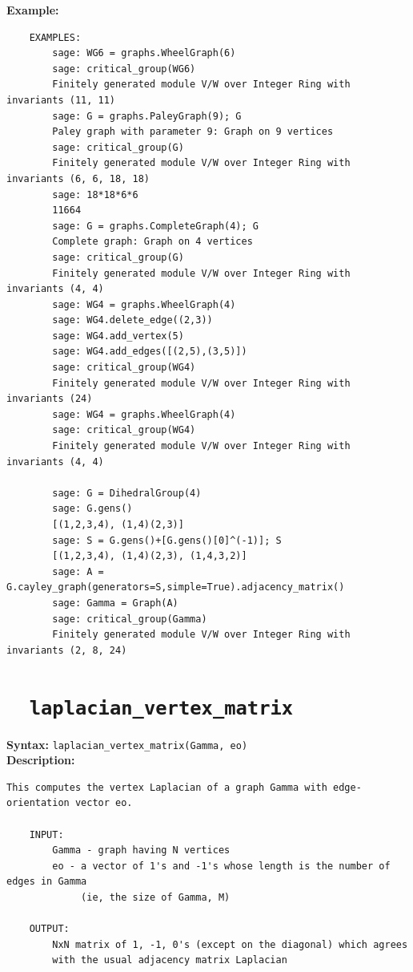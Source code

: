 \documentclass{article}
\begin{document}
\textbf{Example:}
\begin{verbatim}
    EXAMPLES:
        sage: WG6 = graphs.WheelGraph(6)
        sage: critical_group(WG6)
        Finitely generated module V/W over Integer Ring with invariants (11, 11)
        sage: G = graphs.PaleyGraph(9); G
        Paley graph with parameter 9: Graph on 9 vertices
        sage: critical_group(G)
        Finitely generated module V/W over Integer Ring with invariants (6, 6, 18, 18)
        sage: 18*18*6*6
        11664
        sage: G = graphs.CompleteGraph(4); G
        Complete graph: Graph on 4 vertices
        sage: critical_group(G)
        Finitely generated module V/W over Integer Ring with invariants (4, 4)
        sage: WG4 = graphs.WheelGraph(4)
        sage: WG4.delete_edge((2,3))
        sage: WG4.add_vertex(5)
        sage: WG4.add_edges([(2,5),(3,5)])
        sage: critical_group(WG4)
        Finitely generated module V/W over Integer Ring with invariants (24)
        sage: WG4 = graphs.WheelGraph(4)
        sage: critical_group(WG4)
        Finitely generated module V/W over Integer Ring with invariants (4, 4)

        sage: G = DihedralGroup(4)
        sage: G.gens()
        [(1,2,3,4), (1,4)(2,3)]
        sage: S = G.gens()+[G.gens()[0]^(-1)]; S
        [(1,2,3,4), (1,4)(2,3), (1,4,3,2)]
        sage: A = G.cayley_graph(generators=S,simple=True).adjacency_matrix()
        sage: Gamma = Graph(A)
        sage: critical_group(Gamma)
        Finitely generated module V/W over Integer Ring with invariants (2, 8, 24)
\end{verbatim}

\section{\tt \ \ laplacian\_vertex\_matrix}

\textbf{Syntax:} \verb}laplacian_vertex_matrix(Gamma, eo)}\\

\textbf{Description:}
\begin{verbatim}
This computes the vertex Laplacian of a graph Gamma with edge-orientation vector eo. 

    INPUT:
        Gamma - graph having N vertices
        eo - a vector of 1's and -1's whose length is the number of edges in Gamma
             (ie, the size of Gamma, M)

    OUTPUT:
        NxN matrix of 1, -1, 0's (except on the diagonal) which agrees 
        with the usual adjacency matrix Laplacian 
\end{verbatim}
\end{document}

